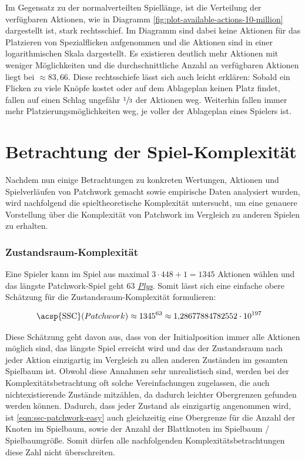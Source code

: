 Im Gegensatz zu der normalverteilten Spiellänge, ist die Verteilung der verfügbaren Aktionen, wie in Diagramm \ref{fig:plot-available-actions-10-million} dargestellt ist, stark rechtsschief. Im Diagramm sind dabei keine Aktionen für das Platzieren von Spezialflicken aufgenommen und die Aktionen sind in einer logarithmischen Skala dargestellt. Es existieren deutlich mehr Aktionen mit weniger Möglichkeiten und die durchschnittliche Anzahl an verfügbaren Aktionen liegt bei ${\approx}83{,}66$. Diese rechtsschiefe lässt sich auch leicht erklären: Sobald ein Flicken zu viele Knöpfe kostet oder auf dem Ablageplan keinen Platz findet, fallen auf einen Schlag ungefähr $\sfrac{1}{3}$ der Aktionen weg. Weiterhin fallen immer mehr Platzierungsmöglichkeiten weg, je voller der Ablageplan eines Spielers ist.

\section{Betrachtung der Spiel-Komplexität}

Nachdem nun einige Betrachtungen zu konkreten Wertungen, Aktionen und Spielverläufen von Patchwork gemacht sowie empirische Daten analysiert wurden, wird nachfolgend die spieltheoretische Komplexität untersucht, um eine genauere Vorstellung über die Komplexität von Patchwork im Vergleich zu anderen Spielen zu erhalten.

\subsubsection*{Zustandsraum-Komplexität}

Eine Spieler kann im Spiel aus maximal $3 \cdot 448 + 1 = 1345$ Aktionen wählen und das längste Patchwork-Spiel geht 63 \hyperref[text:ply]{\emph{Plys}}. Somit lässt sich eine einfache obere Schätzung für die Zustandsraum-Komplexität formulieren:

\begin{align}
    \label{eqn:ssc-patchwork-easy}
    \text{\acsp{SSC}}(Patchwork) & \approx 1345^{63} \approx 1{,}28677884782552 \cdot 10^{197}
\end{align}

Diese Schätzung geht davon aus, dass von der Initialposition immer alle Aktionen möglich sind, das längste Spiel erreicht wird und das der Zustandsraum nach jeder Aktion einzigartig im Vergleich zu allen anderen Zuständen im gesamten Spielbaum ist. Obwohl diese Annahmen sehr unrealistisch sind, werden bei der Komplexitätsbetrachtung oft solche Vereinfachungen zugelassen, die auch nichtexistierende Zustände mitzählen, da dadurch leichter Obergrenzen gefunden werden können. Dadurch, dass jeder Zustand als einzigartig angenommen wird, ist \ref{eqn:ssc-patchwork-easy} auch gleichzeitig eine Obergrenze für die Anzahl der Knoten im Spielbaum, sowie der Anzahl der Blattknoten im Spielbaum / Spielbaumgröße. Somit dürfen alle nachfolgenden Komplexitätsbetrachtungen diese Zahl nicht überschreiten.

